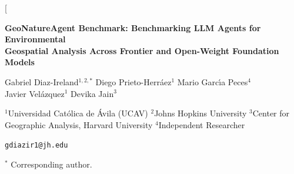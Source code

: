 \documentclass[10pt,twocolumn]{article}
\begin{document}
\twocolumn[
\begin{@twocolumnfalse}
\begin{center}
{\LARGE\bfseries GeoNatureAgent Benchmark: Benchmarking LLM Agents for Environmental\\[3pt] Geospatial Analysis Across Frontier and Open-Weight Foundation Models\par}
\vspace{12pt}
{\large Gabriel Diaz-Ireland$^{1,2,*}$ \quad Diego Prieto-Herr\'{a}ez$^{1}$ \quad Mario Garc\'{\i}a Peces$^{4}$\\[4pt] Javier Vel\'{a}zquez$^{1}$ \quad Devika Jain$^{3}$\par}
\vspace{6pt}
{\normalsize $^{1}$Universidad Cat\'{o}lica de \'{A}vila (UCAV) \quad $^{2}$Johns Hopkins University \quad $^{3}$Center for Geographic Analysis, Harvard University \quad $^{4}$Independent Researcher\par}
\vspace{4pt}
{\small\texttt{gdiazir1@jh.edu}\par}
\vspace{3pt}
{\footnotesize $^{*}$ Corresponding author.\par}
\vspace{14pt}
\end{center}


\end{@twocolumnfalse}
\end{document}
